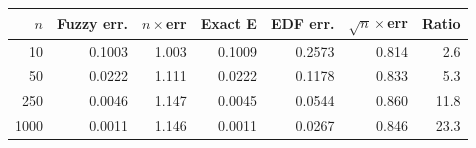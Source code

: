 \begin{tabular}{rrrrrrr}
\toprule
$n$ & Fuzzy err. & $n\times$err & Exact E & EDF err. & $\sqrt n\times$err & Ratio \\
\midrule
10 & 0.1003 & 1.003 & 0.1009 & 0.2573 & 0.814 & 2.6 \\
50 & 0.0222 & 1.111 & 0.0222 & 0.1178 & 0.833 & 5.3 \\
250 & 0.0046 & 1.147 & 0.0045 & 0.0544 & 0.860 & 11.8 \\
1000 & 0.0011 & 1.146 & 0.0011 & 0.0267 & 0.846 & 23.3 \\
\bottomrule
\end{tabular}
